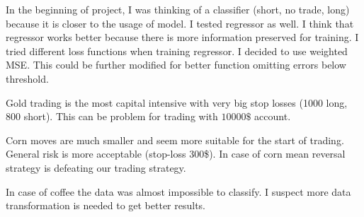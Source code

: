 \documentclass[final,2p]{elsarticle}
\begin{document}
In the beginning of project, I was thinking of a classifier (short, no trade, long) because it is closer to the usage of model. I tested regressor as well. I think that regressor works better because there is more information preserved for training. I tried different loss functions when training regressor. I decided to use weighted MSE. This could be further modified for better function omitting errors below threshold.

Gold trading is the most capital intensive with very big stop losses (1000 long, 800 short). This can be problem for trading with $10 000\$$ account.

Corn moves are much smaller and seem more suitable for the start of trading. General risk is more acceptable (stop-loss 300\$). In case of corn mean reversal strategy is defeating our trading strategy.

In case of coffee the data was almost impossible to classify. I suspect more data transformation is needed to get better results.
\end{document}
